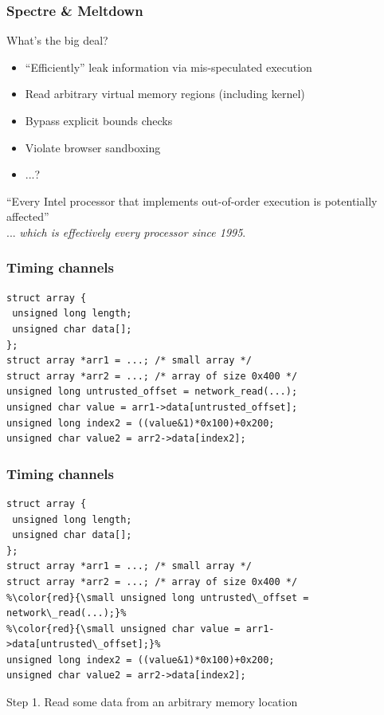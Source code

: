 \documentclass[10pt,handout]{beamer}
\begin{document}

\begin{frame}

\frametitle{Spectre \& Meltdown}

What's the big deal? \pause
\begin{itemize}
\item ``Efficiently'' leak information via mis-speculated execution
\item Read arbitrary virtual memory regions (including kernel)
\item Bypass explicit bounds checks
\item Violate browser sandboxing
\item ...? \\[1em]
\end{itemize}

\pause
\begin{center}
``Every Intel processor that implements out-of-order execution is potentially affected''
\\[1ex] \pause
... \emph{which is effectively every processor since 1995}.
\end{center}

\end{frame}


\begin{frame}[fragile]

\frametitle{Timing channels}

\begin{lstlisting}[basicstyle=\small,style=customjava]
struct array {
 unsigned long length;
 unsigned char data[];
};
struct array *arr1 = ...; /* small array */
struct array *arr2 = ...; /* array of size 0x400 */
unsigned long untrusted_offset = network_read(...);
unsigned char value = arr1->data[untrusted_offset];
unsigned long index2 = ((value&1)*0x100)+0x200;
unsigned char value2 = arr2->data[index2];
\end{lstlisting}

\end{frame}


\begin{frame}[fragile]

\frametitle{Timing channels}

\begin{lstlisting}[basicstyle=\small,style=customjava]
struct array {
 unsigned long length;
 unsigned char data[];
};
struct array *arr1 = ...; /* small array */
struct array *arr2 = ...; /* array of size 0x400 */
%\color{red}{\small unsigned long untrusted\_offset = network\_read(...);}%
%\color{red}{\small unsigned char value = arr1->data[untrusted\_offset];}%
unsigned long index2 = ((value&1)*0x100)+0x200;
unsigned char value2 = arr2->data[index2];
\end{lstlisting}

\begin{center}
Step 1. Read some data from an arbitrary memory location
\end{center}

\end{frame}
\end{document}
